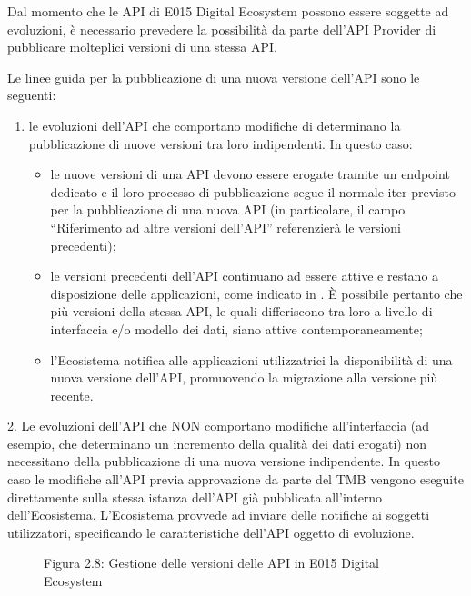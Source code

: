 \documentclass[letterpaper,10pt,italian]{sphinxmanual}
\begin{document}
Dal momento che le API di E015 Digital Ecosystem possono essere soggette ad evoluzioni, è necessario prevedere la possibilità da parte dell’API Provider di pubblicare molteplici versioni di una stessa API.

Le linee guida per la pubblicazione di una nuova versione dell’API sono le seguenti:
\begin{enumerate}
\item {} 
le evoluzioni dell’API che comportano modifiche di  determinano la pubblicazione di nuove versioni tra loro indipendenti. In questo caso:
\begin{itemize}
\item {} 
le nuove versioni di una API devono essere erogate tramite un endpoint dedicato e il loro processo di pubblicazione segue il normale iter previsto per la pubblicazione di una nuova API (in particolare, il campo “Riferimento ad altre versioni dell’API” referenzierà le versioni precedenti);

\item {} 
le versioni precedenti dell’API continuano ad essere attive e restano a disposizione delle applicazioni, come indicato in {\hyperref[\detokenize{sez27:versioniapi}]{}}. È possibile pertanto che più versioni della stessa API, le quali differiscono tra loro a livello di interfaccia e/o modello dei dati, siano attive contemporaneamente;

\item {} 
l’Ecosistema notifica alle applicazioni utilizzatrici la disponibilità di una nuova versione dell’API, promuovendo la migrazione alla versione più recente.

\end{itemize}

\end{enumerate}

2. Le evoluzioni dell’API che NON comportano modifiche all’interfaccia (ad esempio, che determinano un incremento della qualità dei dati erogati) non necessitano della pubblicazione di una nuova versione indipendente.
In questo caso le modifiche all’API \textendash{} previa approvazione da parte del TMB \textendash{} vengono eseguite direttamente sulla stessa istanza dell’API già pubblicata all’interno dell’Ecosistema.
L’Ecosistema provvede ad inviare delle notifiche ai soggetti utilizzatori, specificando le caratteristiche dell’API oggetto di evoluzione.

\begin{figure}[htbp]
\centering
\capstart

\noindent{}
\caption{Figura 2.8: Gestione delle versioni delle API in E015 Digital Ecosystem}\label{\detokenize{sez27:versioniapi}}\label{\detokenize{sez27:id2}}\end{figure}
\end{document}
